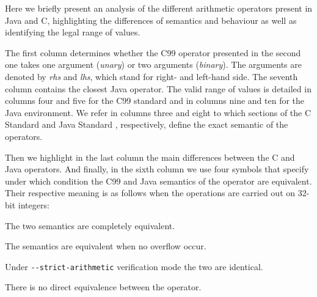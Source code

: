 \documentclass[a4paper,twoside]{article}
\newcommand{\Inline}[1]{\lstinline[basicstyle=\ttfamily]|#1|}
\begin{document}
Here we briefly present an analysis of the different arithmetic operators
present in Java and C, highlighting the differences of semantics and behaviour
as well as identifying the legal range of values.

The first column determines whether the C99 operator presented in the second one
takes one argument (\emph{unary}) or two arguments (\emph{binary}). The
arguments are denoted by \emph{rhs} and \emph{lhs}, which stand for right- and
left-hand side. The seventh column contains the closest Java operator. The valid
range of values is detailed in columns four and five for the C99 standard and in
columns nine and ten for the Java environment. We refer in columns three and
eight to which sections of the C Standard \cite{c99} and Java Standard
\cite{java8}, respectively, define the exact semantic of the operators.

Then we highlight in the last column the main differences between the C and Java
operators. And finally, in the sixth column we use four symbols that specify
under which condition the C99 and Java semantics of the operator are equivalent.
Their respective meaning is as follows when the operations are carried out on
32-bit integers:

\newcommand{\SemEqual}{\checkmark}
\newcommand{\SemOverflow}{$\mathcal{O}$}%
\newcommand{\SemStrict}{$\mathcal{S}$}%
\newcommand{\SemNA}{\ding{53}}

\begin{description}[style=nextline]
\item[\SemEqual] The two semantics are completely equivalent.
\item[\SemOverflow] The semantics are equivalent when no overflow occur.
\item[\SemStrict] Under \Inline{--strict-arithmetic} verification mode the two
are identical.
\item[\SemNA] There is no direct equivalence between the operator.
\end{description}
\end{document}
